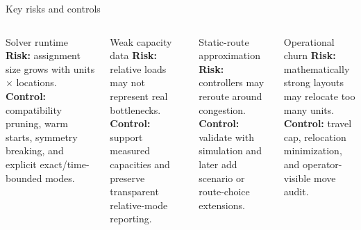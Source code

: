 \documentclass[aspectratio=169,10pt]{beamer}
\begin{document}
\begin{frame}{Key risks and controls}
  \begin{columns}[T,onlytextwidth]
      \begin{block}{Solver runtime}
        \textbf{Risk:} assignment size grows with units \(\times\) locations.\\
        \textbf{Control:} compatibility pruning, warm starts, symmetry breaking,
        and explicit exact/time-bounded modes.
      \end{block}

      \begin{block}{Weak capacity data}
        \textbf{Risk:} relative loads may not represent real bottlenecks.\\
        \textbf{Control:} support measured capacities and preserve transparent
        relative-mode reporting.
      \end{block}

      \begin{block}{Static-route approximation}
        \textbf{Risk:} controllers may reroute around congestion.\\
        \textbf{Control:} validate with simulation and later add scenario or
        route-choice extensions.
      \end{block}

      \begin{block}{Operational churn}
        \textbf{Risk:} mathematically strong layouts may relocate too many units.\\
        \textbf{Control:} travel cap, relocation minimization, and operator-visible
        move audit.
      \end{block}
  \end{columns}
\end{frame}
\end{document}
